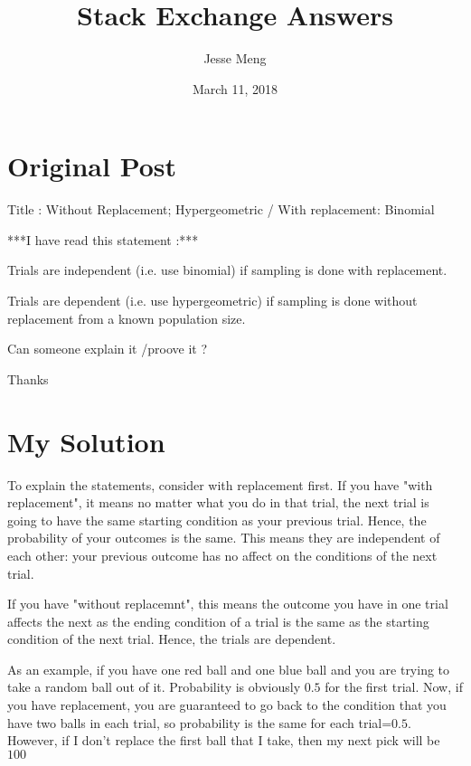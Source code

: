 \documentclass{article}
\title{Stack Exchange Answers}
\author{Jesse Meng }
\date{March 11, 2018}
\begin{document}
\maketitle

\section{Original Post}
Title : Without Replacement; Hypergeometric / With replacement: Binomial

***I have read this statement :***

Trials are independent (i.e. use binomial) if sampling is done with replacement.
    
Trials are dependent (i.e. use hypergeometric) if sampling is done without replacement from a known population size.

Can someone explain it /proove it ? 

Thanks 
\section{My Solution}
To explain the statements, consider with replacement first. If you have "with replacement", it means no matter what you do in that trial, the next trial is going to have the same starting condition as your previous trial. Hence, the probability of your outcomes is the same. This means they are independent of each other: your previous outcome has no affect on the conditions of the next trial. 

If you have "without replacemnt", this means the outcome you have in one trial affects the next as the ending condition of a trial is the same as the starting condition of the next trial. Hence, the trials are dependent.

As an example, if you have one red ball and one blue ball and you are trying to take a random ball out of it. Probability is obviously $0.5$ for the first trial. Now, if you have replacement, you are guaranteed to go back to the condition that you have two balls in each trial, so probability is the same for each trial=$0.5$. However, if I don't replace the first ball that I take, then my next pick will be $100$%
\end{document}
